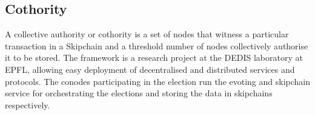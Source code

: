 \subsection{Cothority}

A collective authority or cothority \cite{cothority} is a set of nodes that witness a particular transaction in a Skipchain and a threshold number of nodes collectively authorise it to be stored. The framework is a research project at the DEDIS laboratory at EPFL, allowing easy deployment of decentralised and distributed services and protocols. The conodes participating in the election run the evoting and skipchain service for orchestrating the elections and storing the data in skipchains respectively.
